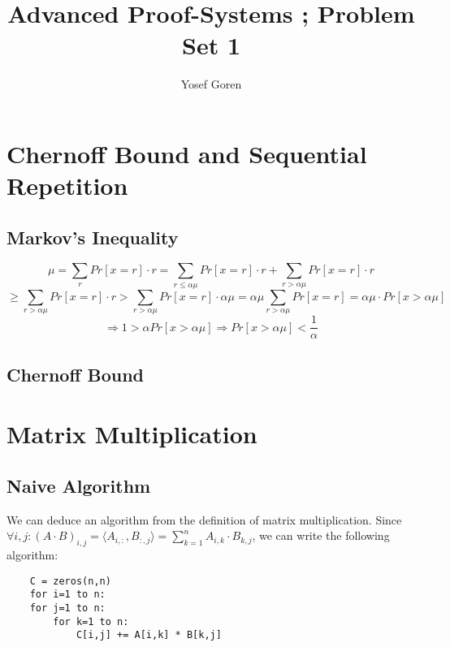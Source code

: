 \documentclass{article}
\begin{document}
\author{Yosef Goren}
\title{Advanced Proof-Systems ; Problem Set 1}
\maketitle

\section{Chernoff Bound and Sequential Repetition}
\subsection{Markov's Inequality}
\[
    \mu = \sum_rPr[x=r]\cdot r
    = \sum_{r\leq \alpha\mu}Pr[x=r]\cdot r + \sum_{r>\alpha\mu}Pr[x=r]\cdot r\]\[
    \geq \sum_{r>\alpha\mu}Pr[x=r]\cdot r> \sum_{r>\alpha\mu}Pr[x=r]\cdot \alpha\mu
    =\alpha\mu\sum_{r>\alpha\mu}Pr[x=r]
    = \alpha\mu\cdot Pr[x>\alpha\mu]\]\[
    \Rightarrow 1>\alpha Pr[x>\alpha\mu]
    \Rightarrow Pr[x>\alpha\mu] < \frac{1}{\alpha}
\]

\subsection{Chernoff Bound}


\section{}
\section{}
\section{Matrix Multiplication}
\subsection{Naive Algorithm}
We can deduce an algorithm from the definition of matrix multiplication.
Since $\forall i,j: (A\cdot B)_{i,j}=\langle A_{i,:},B_{:,j}\rangle =\sum_{k=1}^nA_{i,k}\cdot B_{k,j}$,
we can write the following algorithm:
\begin{lstlisting}
    C = zeros(n,n)
    for i=1 to n:
    for j=1 to n:
        for k=1 to n:
            C[i,j] += A[i,k] * B[k,j]
\end{lstlisting}
\end{document}
